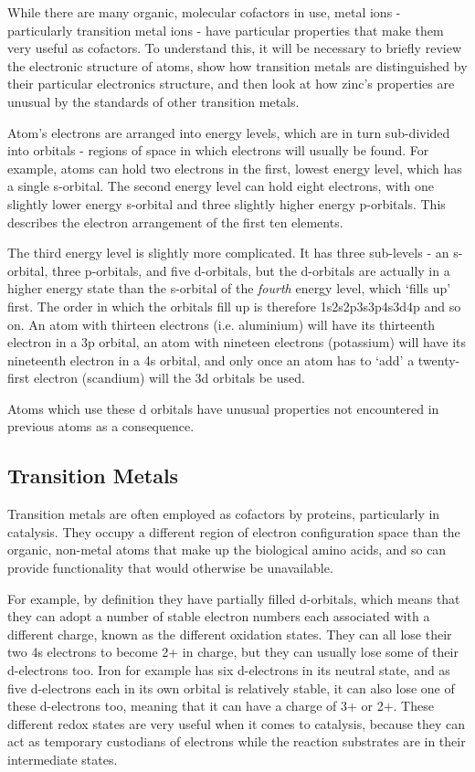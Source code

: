 While there are many organic, molecular cofactors in use, metal ions - particularly transition metal ions - have particular properties that make them very useful as cofactors. To understand this, it will be necessary to briefly review the electronic structure of atoms, show how transition metals are distinguished by their particular electronics structure, and then look at how zinc's properties are unusual by the standards of other transition metals.

Atom's electrons are arranged into energy levels, which are in turn sub-divided into orbitals - regions of space in which electrons will usually be found. For example, atoms can hold two electrons in the first, lowest energy level, which has a single s-orbital. The second energy level can hold eight electrons, with one slightly lower energy s-orbital and three slightly higher energy p-orbitals. This describes the electron arrangement of the first ten elements.

The third energy level is slightly more complicated. It has three sub-levels - an s-orbital, three p-orbitals, and five d-orbitals, but the d-orbitals are actually in a higher energy state than the s-orbital of the \emph{fourth} energy level, which `fills up' first. The order in which the orbitals fill up is therefore 1s2s2p3s3p4s3d4p and so on. An atom with thirteen electrons (i.e. aluminium) will have its thirteenth electron in a 3p orbital, an atom with nineteen electrons (potassium) will have its nineteenth electron in a 4s orbital, and only once an atom has to `add' a twenty-first electron (scandium) will the 3d orbitals be used.

Atoms which use these d orbitals have unusual properties not encountered in previous atoms as a consequence.

\subsection{Transition Metals}

Transition metals are often employed as cofactors by proteins, particularly in catalysis. They occupy a different region of electron configuration space than the organic, non-metal atoms that make up the biological amino acids, and so can provide functionality that would otherwise be unavailable.

For example, by definition they have partially filled d-orbitals, which means that they can adopt a number of stable electron numbers each associated with a different charge, known as the different oxidation states. They can all lose their two 4s electrons to become 2+ in charge, but they can usually lose some of their d-electrons too. Iron for example has six d-electrons in its neutral state, and as five d-electrons each in its own orbital is relatively stable, it can also lose one of these d-electrons too, meaning that it can have a charge of 3+ or 2+. These different redox states are very useful when it comes to catalysis, because they can act as temporary custodians of electrons while the reaction substrates are in their intermediate states.

